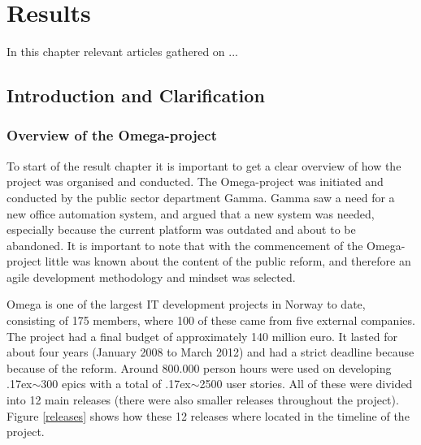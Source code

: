 \chapter{Results}
\label{results}

\minitoc

In this chapter relevant articles gathered on ...

\newpage

\section{Introduction and Clarification}

\subsection{Overview of the Omega-project}

To start of the result chapter it is important to get a clear overview of how the project was organised and conducted. The Omega-project was initiated and conducted by the public sector department Gamma. Gamma saw a need for a new office automation system, and argued that a new system was needed, especially because the current platform was outdated and about to be abandoned. It is important to note that with the commencement of the Omega-project little was known about the content of the public reform, and therefore an agile development methodology and mindset was selected.

Omega is one of the largest IT development projects in Norway to date, consisting of 175 members, where 100 of these came from five external companies. The project had a final budget of approximately 140 million euro. It lasted for about four years (January 2008 to March 2012) and had a strict deadline because because of the reform. Around 800.000 person hours were used on developing {\raise.17ex\hbox{$\scriptstyle\mathtt{\sim}$}}300 epics with a total of {\raise.17ex\hbox{$\scriptstyle\mathtt{\sim}$}}2500 user stories. All of these were divided into 12 main releases (there were also smaller releases throughout the project). Figure \ref{releases} shows how these 12 releases where located in the timeline of the project.

